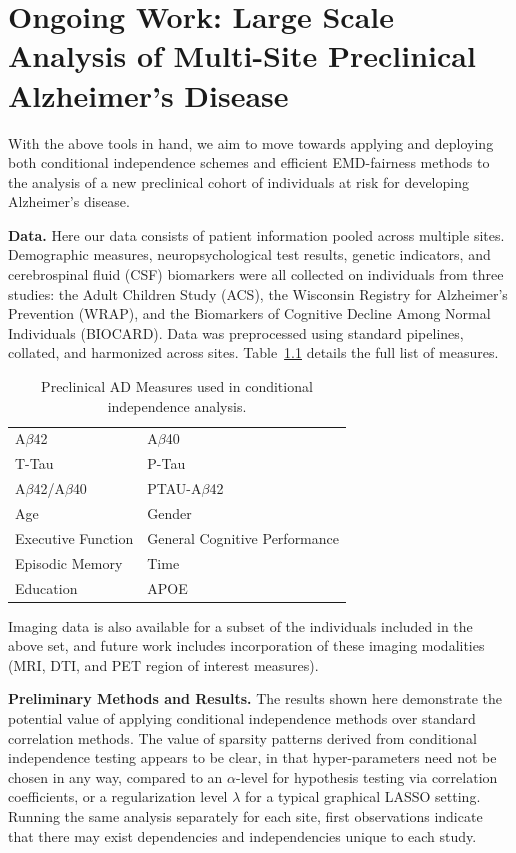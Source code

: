 \chapter{Ongoing Work: Large Scale Analysis of Multi-Site Preclinical Alzheimer's Disease} \label{chap:pac} 

With the above tools in hand, we aim to move towards applying and deploying both conditional independence schemes and efficient EMD-fairness methods to 
the analysis of a new preclinical cohort of individuals at risk for developing Alzheimer's disease.

\textbf{Data.} Here our data consists of patient information pooled across multiple sites. Demographic measures, neuropsychological test results, genetic indicators, and cerebrospinal fluid (CSF) biomarkers were all collected on individuals from three studies: the Adult Children Study (ACS), the Wisconsin Registry for Alzheimer's Prevention (WRAP), and the Biomarkers of Cognitive Decline Among Normal Individuals (BIOCARD). Data was preprocessed using standard pipelines, collated, and harmonized across sites. Table~\ref{tab:pacfeats} details the full list of measures.

\begin{table}
    \centering
    \begin{tabular}{l|l}
        \hline\hline
         A$\beta$42 & A$\beta$40 \\
         T-Tau & P-Tau \\
         A$\beta$42/A$\beta$40 & PTAU-A$\beta$42 \\
         Age & Gender \\
         Executive Function & General Cognitive Performance \\
         Episodic Memory & Time \\
         Education & APOE \\
         \hline\hline
    \end{tabular}
    \caption{Preclinical AD Measures used in conditional independence analysis.}
    \label{tab:pacfeats}
\end{table}

Imaging data is also available for a subset of the individuals included in the above set, and future work includes incorporation of these imaging modalities (MRI, DTI, and PET region of interest measures).

\textbf{Preliminary Methods and Results.} The results shown here demonstrate the potential value of applying conditional independence methods over standard correlation methods. The value of sparsity patterns derived from conditional independence testing appears to be clear, in that hyper-parameters need not be chosen in any way, compared to an $\alpha$-level for hypothesis testing via correlation coefficients, or a regularization level $\lambda$ for a typical graphical LASSO setting. Running the same analysis separately for each site, first observations indicate that there may exist dependencies and independencies unique to each study.

